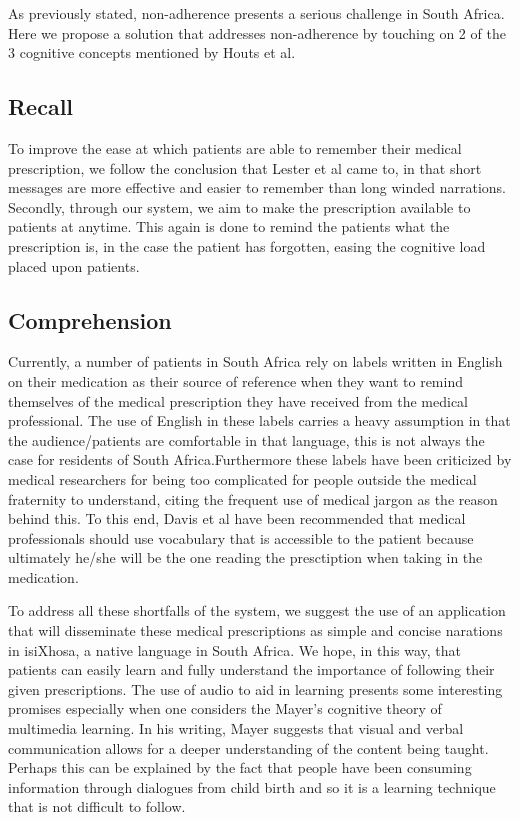 As previously stated, non-adherence presents a serious challenge in South Africa. Here we propose a solution that addresses non-adherence by touching on 2 of the 3 cognitive concepts mentioned by Houts et al.
\subsection{Recall}
To improve the ease at which patients are able to remember their medical prescription, we follow the conclusion that Lester et al came to, in that short messages are more effective and easier to remember than long winded narrations. Secondly, through our system, we aim to make the prescription available to patients at anytime. This again is done to remind the patients what the prescription is, in the case the patient has forgotten, easing the cognitive load placed upon patients.
\subsection{Comprehension}
Currently, a number of patients in South Africa rely on labels written in English on their medication as their source of reference when they want to remind themselves of the medical prescription they have received from the medical professional. The use of English in these labels carries a heavy assumption in that the audience/patients are comfortable in that language, this is not always the case for residents of South Africa.Furthermore these labels have been criticized by medical researchers for being too complicated for people outside the medical fraternity to understand, citing the frequent use of medical jargon as the reason behind this\cite{Houts06}. To this end, Davis et al have been recommended that medical professionals should use vocabulary that is accessible to the patient because ultimately he/she will be the one reading the presctiption when taking in the medication.

To address all these shortfalls of the system, we suggest the use of an application that will disseminate these medical prescriptions as simple and concise narations in isiXhosa, a native language in South Africa. We hope, in this way, that patients can easily learn and fully understand the importance of following their given prescriptions. The use of audio to aid in learning presents some interesting promises especially when one considers the Mayer's cognitive theory of multimedia learning. In his writing, Mayer suggests that visual and verbal communication allows for a deeper understanding of the content being taught\cite{WilsonWolf}. Perhaps this can be explained by the fact that people have been consuming information through dialogues from child birth and so it is a learning technique that is not difficult to follow\cite{Patel10}.
